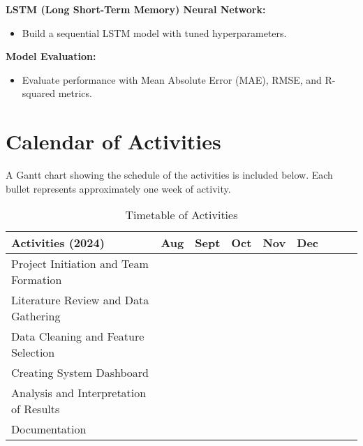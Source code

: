 \textbf{LSTM (Long Short-Term Memory) Neural Network:}
\begin{itemize}
	\item Build a sequential LSTM model with tuned hyperparameters.
\end{itemize}

\textbf{Model Evaluation:}
\begin{itemize}
	\item Evaluate performance with Mean Absolute Error (MAE), RMSE, and R-squared metrics.
\end{itemize}

\section{Calendar of Activities}

A Gantt chart showing the schedule of the activities is included below. Each bullet represents approximately one week of activity.

\newcommand{\weekone}{\textbullet}
\newcommand{\weektwo}{\textbullet \textbullet}
\newcommand{\weekthree}{\textbullet \textbullet \textbullet}
\newcommand{\weekfour}{\textbullet \textbullet \textbullet \textbullet}

\begin{table}[ht]
	\centering
	\caption{Timetable of Activities} \vspace{0.25em}
	\begin{tabular}{|p{2in}|c|c|c|c|c|c|c|c|} \hline
		Activities (2024) & Aug & Sept & Oct & Nov & Dec \\ \hline
		Project Initiation and Team Formation & \weektwo & & & & \\ \hline
		Literature Review and Data Gathering & \weektwo & \weekfour & & & \\ \hline
		Data Cleaning and Feature Selection & & \weektwo & & \weekone & \\ \hline
		
		
		Creating System Dashboard & & \weekone & \weektwo & \weekone & \\ \hline
		Analysis and Interpretation of Results & & & \weekone & & \\ \hline
		Documentation & & \weekone & \weekfour & \weekone & \\ \hline
	\end{tabular}
	\label{tab:timetableactivities}
\end{table}


